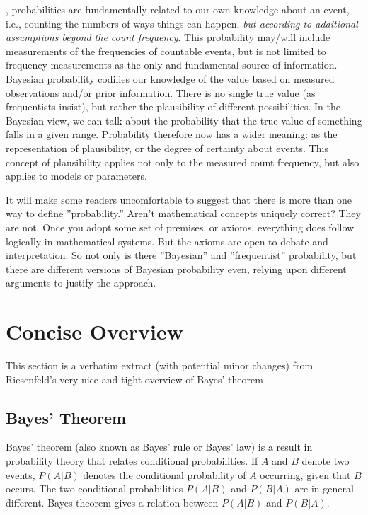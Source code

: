 , probabilities are fundamentally related to our own knowledge about an event, i.e., counting the numbers of ways things can happen, \textit{but according to additional assumptions beyond the count frequency}. This probability may/will include measurements  of the frequencies of countable events, but is not limited to frequency measurements as the only and fundamental source of information. Bayesian probability codifies our knowledge of the value based on measured observations and/or  prior information.  There is no single true value (as frequentists  insist), but rather the plausibility of different possibilities. In the Bayesian view, we can talk about the probability that the true value of something falls in a given range. Probability therefore now  has a wider meaning: as the representation of  plausibility, or the degree of certainty about events.  This concept of plausibility applies not only to the measured count frequency, but also applies to models or parameters.
 \cite{McElreath2015,vanderPlasFreqBayes2014}

 It will make some readers uncomfortable to suggest that
there is more than one way to define ''probability.'' Aren't mathematical concepts uniquely correct?
They are not. Once you adopt some set of premises, or axioms, everything does follow logically in
mathematical systems. But the axioms are open to debate and interpretation. So not only is there
''Bayesian'' and ''frequentist'' probability, but there are different versions of Bayesian probability even, relying upon different arguments to justify the approach.\cite{McElreath2015}

\section{Concise Overview}

This section is a verbatim extract (with potential minor changes) from Riesenfeld's very nice and tight overview of Bayes' theorem \cite{RichRiesenfeld2011}. 

\subsection{Bayes' Theorem}

Bayes' theorem (also known as Bayes' rule or Bayes' law) is a result in probability theory that relates conditional probabilities. If $A$ and $B$ denote two events,
$P(A|B)$ denotes the conditional probability of $A$ occurring, given that $B$ occurs.
The two conditional probabilities $P(A|B)$ and $P(B|A)$ are in general different.
Bayes theorem gives a relation between $P(A|B)$ and $P(B|A)$.

